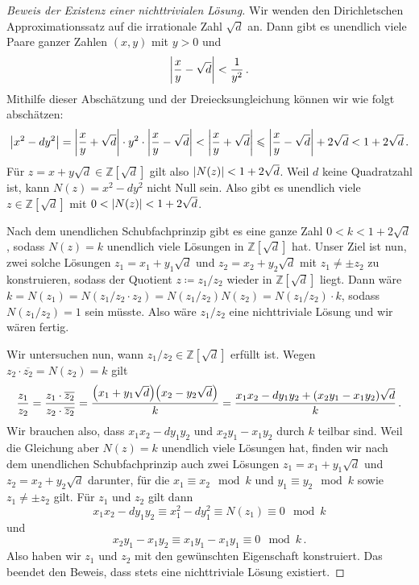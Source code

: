 \begin{proof}[Beweis der Existenz einer nichttrivialen Lösung]
	Wir wenden den Dirichletschen Approximationssatz auf die irrationale Zahl $\sqrt{d}$ an. Dann gibt es unendlich viele Paare ganzer Zahlen $(x,y)$ mit $y>0$ und
	\begin{equation*}
		\abs*{\frac xy-\sqrt{d}}<\frac{1}{y^2}\,.
	\end{equation*}
	Mithilfe dieser Abschätzung und der Dreiecksungleichung können wir wie folgt abschätzen:
	\begin{equation*}
		\abs*{x^2-dy^2}=\abs*{\frac xy+\sqrt{d}}\cdot y^2\cdot \abs*{\frac{x}{y}-\sqrt{d}}<\left|\frac{x}{y}+\sqrt{d}\right|\leqslant \abs*{\frac xy-\sqrt{d}}+2\sqrt{d}<1+2\sqrt{d}\,.
	\end{equation*}
	Für $z=x+y\sqrt{d}\in\mathbb Z[\sqrt{d}]$ gilt also $\abs{N(z)}<1+2\sqrt{d}$. Weil $d$ keine Quadratzahl ist, kann $N(z)=x^2-dy^2$ nicht Null sein. Also gibt es unendlich viele $z\in\mathbb Z[\sqrt{d}]$ mit $0<\abs{N(z)}<1+2\sqrt{d}$.
	
	Nach dem unendlichen Schubfachprinzip gibt es eine ganze Zahl $0<k<1+2\sqrt{d}$, sodass $N(z)=k$ unendlich viele Lösungen in $\mathbb Z[\sqrt{d}]$ hat. Unser Ziel ist nun, zwei solche Lösungen $z_1=x_1+y_1\sqrt{d}$ und $z_2=x_2+y_2\sqrt{d}$ mit $z_1\neq \pm z_2$ zu konstruieren, sodass der Quotient $z\coloneqq z_1/z_2$ wieder in $\mathbb Z[\sqrt{d}]$ liegt. Dann wäre $k=N(z_1)=N(z_1/z_2\cdot z_2)=N(z_1/z_2)N(z_2)=N(z_1/z_2)\cdot k$, sodass $N(z_1/z_2)=1$ sein müsste. Also wäre $z_1/z_2$ eine nichttriviale Lösung und wir wären fertig.
	
	Wir untersuchen nun, wann $z_1/z_2\in \mathbb Z[\sqrt{d}]$ erfüllt ist. Wegen $z_2\cdot\overline{z_2}=N(z_2)=k$ gilt
	\begin{equation*}
		\frac{z_1}{z_2}=\frac{z_1\cdot \overline{z_2}}{z_2\cdot \overline{z_2}}=\frac{\parens*{x_1+y_1\sqrt{d}}\parens*{x_2-y_2\sqrt{d}}}{k}=\frac{x_1x_2-dy_1y_2+(x_2y_1-x_1y_2)\sqrt{d}}k\,.
	\end{equation*}
	Wir brauchen also, dass $x_1x_2-dy_1y_2$ und $x_2y_1-x_1y_2$ durch $k$ teilbar sind. Weil die Gleichung aber $N(z)=k$ unendlich viele Lösungen hat, finden wir nach dem unendlichen Schubfachprinzip auch zwei Lösungen $z_1=x_1+y_1\sqrt{d}$ und $z_2=x_2+y_2\sqrt{d}$ darunter, für die $x_1\equiv x_2\mod k$ und $y_1\equiv y_2\mod k$ sowie $z_1\neq \pm z_2$ gilt. Für $z_1$ und $z_2$ gilt dann 
	\begin{equation*}
		x_1x_2-dy_1y_2\equiv x_1^2-dy_1^2\equiv N(z_1)\equiv 0\mod k
	\end{equation*}
	und
	\begin{equation*}
		x_2y_1-x_1y_2\equiv x_1y_1-x_1y_1\equiv 0\mod k\,.
	\end{equation*}
	Also haben wir $z_1$ und $z_2$ mit den gewünschten Eigenschaft konstruiert. Das beendet den Beweis, dass stets eine nichttriviale Lösung existiert.
\end{proof}

